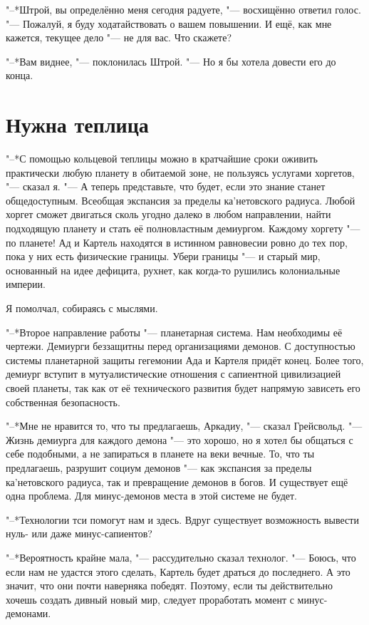 \documentclass[a4paper,10pt]{book}
\begin{document}
"--*Штрой, вы определённо меня сегодня радуете, "--- восхищённо ответил голос. "--- Пожалуй, я буду ходатайствовать о вашем повышении. И ещё, как мне кажется, текущее дело "--- не для вас. Что скажете?

"--*Вам виднее, "--- поклонилась Штрой. "--- Но я бы хотела довести его до конца.

\section{Нужна теплица}

"--*С помощью кольцевой теплицы можно в кратчайшие сроки оживить практически 
любую планету в обитаемой зоне, не пользуясь услугами хоргетов, "--- сказал я. 
"--- А теперь представьте, что будет, если это знание станет общедоступным. 
Всеобщая экспансия за пределы ка'нетовского радиуса. Любой хоргет сможет 
двигаться сколь угодно далеко в любом направлении, найти подходящую планету и 
стать её полновластным демиургом. Каждому хоргету "--- по планете! Ад и Картель 
находятся в истинном равновесии ровно до тех пор, пока у них есть физические 
границы. Убери границы "--- и старый мир, основанный на идее дефицита, рухнет, 
как когда-то рушились колониальные империи.

Я помолчал, собираясь с мыслями.

"--*Второе направление работы "--- планетарная система. Нам необходимы её чертежи. Демиурги беззащитны перед организациями демонов. С доступностью системы планетарной защиты гегемонии Ада и Картеля придёт конец. Более того, демиург вступит в мутуалистические отношения с сапиентной цивилизацией своей планеты, так как от её технического развития будет напрямую зависеть его собственная безопасность.

"--*Мне не нравится то, что ты предлагаешь, Аркадиу, "--- сказал Грейсвольд. "--- Жизнь демиурга для каждого демона "--- это хорошо, но я хотел бы общаться с себе подобными, а не запираться в планете на веки вечные. То, что ты предлагаешь, разрушит социум демонов "--- как экспансия за пределы ка'нетовского радиуса, так и превращение демонов в богов. И существует ещё одна проблема. Для минус-демонов места в этой системе не будет.

"--*Технологии тси помогут нам и здесь. Вдруг существует возможность вывести нуль- или даже минус-сапиентов?

"--*Вероятность крайне мала, "--- рассудительно сказал технолог. "--- Боюсь, что если нам не удастся этого сделать, Картель будет драться до последнего. А это значит, что они почти наверняка победят. Поэтому, если ты действительно хочешь создать дивный новый мир, следует проработать момент с минус-демонами.
\end{document}
